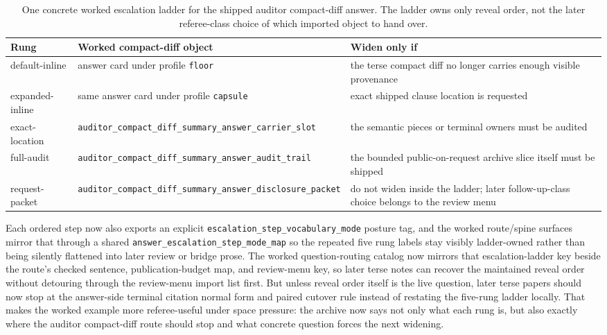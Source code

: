 \documentclass[11pt]{article}
\begin{document}
\begin{table}[t]
\centering
\small
\begin{tabularx}{\linewidth}{@{}l l X@{}}
\toprule
Rung & Worked compact-diff object & Widen only if \\
\midrule
\textsf{default-inline} & answer card under profile \nolinkurl{floor} & the terse compact diff no longer carries enough visible provenance \\
\textsf{expanded-inline} & same answer card under profile \nolinkurl{capsule} & exact shipped clause location is requested \\
\textsf{exact-location} & \nolinkurl{auditor_compact_diff_summary_answer_carrier_slot} & the semantic pieces or terminal owners must be audited \\
\textsf{full-audit} & \nolinkurl{auditor_compact_diff_summary_answer_audit_trail} & the bounded public-on-request archive slice itself must be shipped \\
\textsf{request-packet} & \nolinkurl{auditor_compact_diff_summary_answer_disclosure_packet} & do not widen inside the ladder; later follow-up-class choice belongs to the review menu \\
\bottomrule
\end{tabularx}
\caption{One concrete worked escalation ladder for the shipped auditor compact-diff answer. The ladder owns only reveal order, not the later referee-class choice of which imported object to hand over.}
\label{tab:workedcompactdiffescalationladder}
\end{table}

Each ordered step now also exports an explicit \nolinkurl{escalation_step_vocabulary_mode} posture tag, and the worked route/spine surfaces mirror that through a shared \nolinkurl{answer_escalation_step_mode_map} so the repeated five rung labels stay visibly ladder-owned rather than being silently flattened into later review or bridge prose. The worked question-routing catalog now mirrors that escalation-ladder key beside the route's checked sentence, publication-budget map, and review-menu key, so later terse notes can recover the maintained reveal order without detouring through the review-menu import list first. But unless reveal order itself is the live question, later terse papers should now stop at the answer-side terminal citation normal form and paired cutover rule instead of restating the five-rung ladder locally.\cite{series:challengeanswerreviewmenus,series:pairedterminalcitationdiscipline,series:pairedterminalcutoverrules} That makes the worked example more referee-useful under space pressure: the archive now says not only what each rung is, but also exactly where the auditor compact-diff route should stop and what concrete question forces the next widening.
\end{document}
